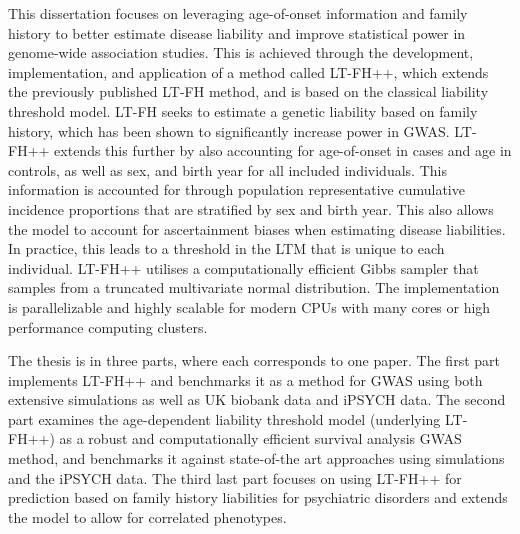 This dissertation focuses on leveraging age-of-onset information and family history to better estimate disease liability and improve statistical power in genome-wide association studies. This is achieved through the  development, implementation, and application of a method called LT-FH++, which extends the previously published LT-FH method, and is based on the classical liability threshold model. LT-FH seeks to estimate a genetic liability based on family history, which has been shown to significantly increase power in GWAS. LT-FH++ extends this further by also accounting for age-of-onset in cases and age in controls, as well as sex, and birth year for all included individuals. This information is accounted for through population representative cumulative incidence proportions that are stratified by sex and birth year. This also allows the model to account for ascertainment biases when estimating disease liabilities. In practice, this leads to a threshold in the LTM that is unique to each individual. LT-FH++ utilises a computationally efficient Gibbs sampler that samples from a truncated multivariate normal distribution. The implementation is parallelizable and highly scalable for modern CPUs with many cores or high performance computing clusters. 

The thesis is in three parts, where each corresponds to one paper. The first part implements LT-FH++ and benchmarks it as a method for GWAS using both extensive simulations as well as UK biobank data and iPSYCH data. The second part examines the age-dependent liability threshold model (underlying LT-FH++) as a robust and computationally efficient survival analysis GWAS method, and benchmarks it against state-of-the art approaches using simulations and the iPSYCH data. The third last part focuses on using LT-FH++ for prediction based on family history liabilities for psychiatric disorders and extends the model to allow for correlated phenotypes. 
